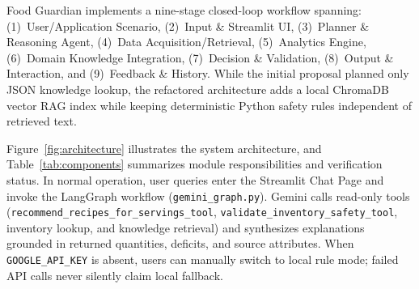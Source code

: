 Food Guardian implements a nine-stage closed-loop workflow spanning: (1)~User/Application Scenario, (2)~Input \& Streamlit UI, (3)~Planner \& Reasoning Agent, (4)~Data Acquisition/Retrieval, (5)~Analytics Engine, (6)~Domain Knowledge Integration, (7)~Decision \& Validation, (8)~Output \& Interaction, and (9)~Feedback \& History. While the initial proposal planned only JSON knowledge lookup, the refactored architecture adds a local ChromaDB vector RAG index while keeping deterministic Python safety rules independent of retrieved text.

Figure~\ref{fig:architecture} illustrates the system architecture, and Table~\ref{tab:components} summarizes module responsibilities and verification status. In normal operation, user queries enter the Streamlit Chat Page and invoke the LangGraph workflow (\texttt{gemini\_graph.py}). Gemini calls read-only tools (\texttt{recommend\_recipes\_\allowbreak for\_servings\_tool}, \texttt{validate\_inventory\_\allowbreak safety\_tool}, inventory lookup, and knowledge retrieval) and synthesizes explanations grounded in returned quantities, deficits, and source attributes. When \texttt{GOOGLE\_API\_KEY} is absent, users can manually switch to local rule mode; failed API calls never silently claim local fallback.

